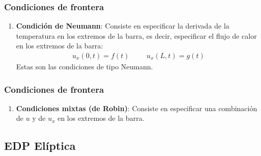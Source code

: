 \documentclass[12pt]{beamer}
\begin{document}
\begin{frame}
\frametitle{Condiciones de frontera}
\begin{enumerate}
\conti
\item \textbf{Condición de Neumann}: Consiste en especificar la derivada de la temperatura en los extremos de la barra, es decir, especificar el flujo de calor en los extremos de la barra:
\begin{align}
u_{x}(0,t) = f(t) \hspace{1cm} u_{x}(L,t) = g(t)
\label{eq:ecuacion_06_02_04}    
\end{align}
Estas son las condiciones de tipo Neumann.
\seti
\end{enumerate}
\end{frame}
\begin{frame}
\frametitle{Condiciones de frontera}
\begin{enumerate}
\conti
\item \textbf{Condiciones mixtas (de Robin)}: Consiste en especificar una combinación de $u$ y de $u_{x}$ en los extremos de la barra.
\end{enumerate}
\end{frame}

\subsection{EDP Elíptica}
\end{document}
